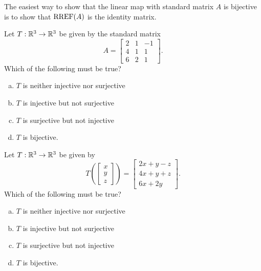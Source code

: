 \begin{applicationActivities}
\begin{observation}
  The easiest way to show that the linear map with standard matrix \(A\)
  is bijective is to show that \(\operatorname{RREF}(A)\) is the identity matrix.
\end{observation}

\begin{activity}{5}
Let $T: \mathbb{R}^3 \rightarrow \mathbb{R}^3$ be given by the standard matrix $$A=\begin{bmatrix} 2&1&-1 \\ 4&1&1 \\ 6&2&1\end{bmatrix}.$$ Which of the following must be true?
\begin{enumerate}[(a)]
\item $T$ is neither injective nor surjective
\item $T$ is injective but not surjective
\item $T$ is surjective but not injective
\item $T$ is bijective.
\end{enumerate}
\end{activity}

\begin{activity}{5}
Let $T: \mathbb{R}^3 \rightarrow \mathbb{R}^3$ be given by $$T\left(\begin{bmatrix} x \\ y  \\ z \end{bmatrix} \right) = \begin{bmatrix} 2x+y-z \\ 4x+y+z \\ 6x+2y\end{bmatrix}.$$   Which of the following must be true?
\begin{enumerate}[(a)]
\item $T$ is neither injective nor surjective
\item $T$ is injective but not surjective
\item $T$ is surjective but not injective
\item $T$ is bijective.
\end{enumerate}
\end{activity}


\end{applicationActivities}
